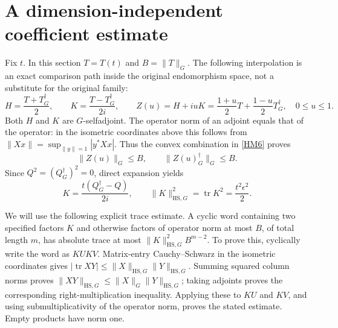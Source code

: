 \documentclass[11pt]{article}
\newcommand{\tr}{\operatorname{tr}}
\newcommand{\adj}{\dagger_G}
\begin{document}
\section{A dimension-independent coefficient estimate}

Fix \(t\). In this section \(T=T(t)\) and \(B=\|T\|_G\).
The following interpolation is an exact comparison path inside the original
endomorphism space, not a substitute for the original family:
\begin{equation}
 H=\frac{T+T^\adj}{2},\qquad K=\frac{T-T^\adj}{2i},\qquad
 Z(u)=H+iuK=\frac{1+u}{2}T+\frac{1-u}{2}T^\adj,
 \quad 0\le u\le1.
 \tag{HM6}\label{HM6}
\end{equation}
Both \(H\) and \(K\) are \(G\)-selfadjoint. The operator norm of an adjoint
equals that of the operator: in the isometric coordinates above this follows
from \(\|Xx\|=\sup_{\|y\|=1}|y^*Xx|\).
Thus the convex combination in \eqref{HM6} proves
\begin{equation}
 \|Z(u)\|_G\le B,\qquad \|Z(u)^\adj\|_G\le B.
 \tag{HM7}\label{HM7}
\end{equation}
Since \(Q^2=(Q^\adj)^2=0\), direct expansion yields
\begin{equation}
 K=\frac{t(Q^\adj-Q)}{2i},\qquad
 \|K\|_{\mathrm{HS},G}^2=\tr K^2=\frac{t^2\epsilon^2}{2}.
 \tag{HM8}\label{HM8}
\end{equation}

We will use the following explicit trace estimate. A cyclic word containing
two specified factors \(K\) and otherwise factors of operator norm at most
\(B\), of total length \(m\), has absolute trace at most
\(\|K\|_{\mathrm{HS},G}^2 B^{m-2}\).
To prove this, cyclically write the word as \(K U K V\). Matrix-entry
Cauchy--Schwarz in the isometric coordinates gives
\(|\tr XY|\le\|X\|_{\mathrm{HS},G}\|Y\|_{\mathrm{HS},G}\).
Summing squared column norms proves
\(\|XY\|_{\mathrm{HS},G}\le\|X\|_G\|Y\|_{\mathrm{HS},G}\);
taking adjoints proves the corresponding right-multiplication inequality.
Applying these to \(KU\) and \(KV\), and using submultiplicativity of the
operator norm, proves the stated estimate. Empty products have norm one.
\end{document}
